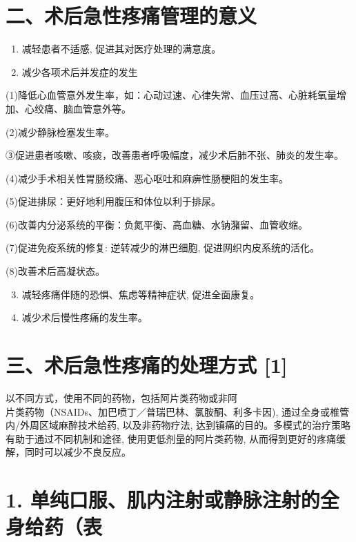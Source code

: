 \documentclass[10pt]{article}
\begin{document}
\section*{二、术后急性疼痛管理的意义}
\begin{enumerate}
  \item 减轻患者不适感, 促进其对医疗处理的满意度。

  \item 减少各项术后并发症的发生

\end{enumerate}

(1)降低心血管意外发生率，如：心动过速、心律失常、血压过高、心脏耗氧量增加、心绞痛、脑血管意外等。

(2)减少静脉检塞发生率。

③促进患者咳嗽、咳痰，改善患者呼吸幅度，减少术后肺不张、肺炎的发生率。

(4)减少手术相关性胃肠绞痛、恶心呕吐和麻痹性肠梗阻的发生率。

(5)促进排尿：更好地利用腹压和体位以利于排尿。

(6)改善内分泌系统的平衡：负氮平衡、高血糖、水钠潴留、血管收缩。

(7)促进免疫系统的修复: 逆转减少的淋巴细胞, 促进网织内皮系统的活化。

(8)改善术后高凝状态。

\begin{enumerate}
  \setcounter{enumi}{2}
  \item 减轻疼痛伴随的恐惧、焦虑等精神症状, 促进全面康复。

  \item 减少术后慢性疼痛的发生率。

\end{enumerate}

\section*{三、术后急性疼痛的处理方式 [1]}
以不同方式，使用不同的药物，包括阿片类药物或非阿\\
片类药物（NSAIDs、加巴喷丁／普瑞巴林、氯胺酮、利多卡因), 通过全身或椎管内/外周区域麻醉技术给药, 以及非药物疗法, 达到镇痛的目的。多模式的治疗策略有助于通过不同机制和途径, 使用更低剂量的阿片类药物, 从而得到更好的疼痛缓解，同时可以减少不良反应。

\section*{1. 单纯口服、肌内注射或静脉注射的全身给药（表}
\end{document}
